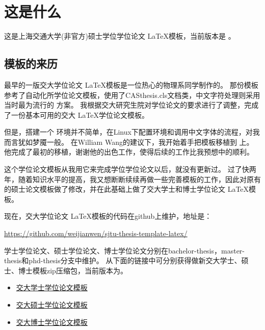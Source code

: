 
\chapter{这是什么}
\label{chap:what}

这是上海交通大学(非官方)硕士学位学位论文 \LaTeX 模板，当前版本是 \version 。

\section{模板的来历}

最早的一版交大学位论文 \LaTeX 模板是一位热心的物理系同学制作的。
那份模板参考了自动化所学位论文模板，使用了CASthesis.cls文档类，中文字符处理则采用当时最为流行的 \CJKLaTeX 方案。
我根据交大研究生院对学位论文的要求进行了调整，完成了一份基本可用的交大 \LaTeX 学位论文模板。

但是，搭建一个 \CJKLaTeX 环境并不简单，在Linux下配置环境和调用中文字体的流程，对我而言犹如梦魇一般。
在William Wang的建议下，我开始着手把模板移植到 \XeTeX 上。
他完成了最初的移植，谢谢他的出色工作，使得后续的工作比我预想中的顺利。

这个学位论文模板从我用它来完成学位学位论文以后，就没有更新过。
过了快两年，随着知识水平的提高，我又想断断续续再做一些完善模板的工作，因此对原有的硕士论文模板做了修改，并在此基础上做了交大学士和博士学位论文 \LaTeX 模板。

现在，交大学位论文 \LaTeX 模板的代码在github上维护，地址是：

	\url{https://github.com/weijianwen/sjtu-thesis-template-latex/}

学士学位论文、硕士学位论文、博士学位论文分别在bachelor-thesis，master-thesis和phd-thesis分支中维护。
从下面的链接中可分别获得做新交大学士、硕士、博士模板zip压缩包，当前版本为\version 。

\begin{itemize}
	\item \href{https://github.com/weijianwen/sjtu-thesis-template-latex/archive/bachelor-0.5.1.zip}{交大学士学位论文模板\version} 
	\item \href{https://github.com/weijianwen/sjtu-thesis-template-latex/archive/master-0.5.1.zip}{交大硕士学位论文模板\version}
	\item \href{https://github.com/weijianwen/sjtu-thesis-template-latex/archive/phd-0.5.1.zip}{交大博士学位论文模板\version}
\end{itemize}

